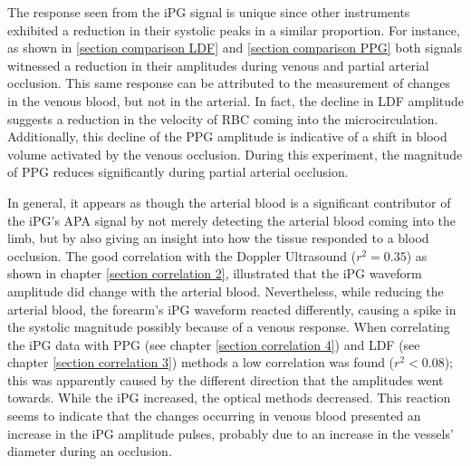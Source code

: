 The response seen from the iPG signal is unique since other instruments exhibited a reduction in their systolic peaks in a similar proportion. For instance, as shown in \ref{section comparison LDF} and \ref{section comparison PPG} both signals witnessed a reduction in their amplitudes during venous and partial arterial occlusion. This same response can be attributed to the measurement of changes in the venous blood, but not in the arterial. In fact, the decline in LDF amplitude suggests a reduction in the velocity of RBC coming into the microcirculation. Additionally, this decline of the PPG amplitude is indicative of a shift in blood volume activated by the venous occlusion. During this experiment, the magnitude of PPG reduces significantly during partial arterial occlusion.

In general, it appears as though the arterial blood is a significant contributor of the iPG's APA signal by not merely detecting the arterial blood coming into the limb, but by also giving an insight into how the tissue responded to a blood occlusion. The good correlation with the Doppler Ultrasound  ($r^2 = 0.35$) as shown in chapter \ref{section correlation 2}, illustrated that the iPG waveform amplitude did change with the arterial blood. Nevertheless, while reducing the arterial blood, the forearm's iPG waveform reacted differently, causing a spike in the systolic magnitude possibly because of a venous response.  When correlating the iPG data with PPG (see chapter \ref{section correlation 4}) and LDF (see chapter \ref{section correlation 3}) methods a low correlation was found ($r^2 < 0.08$); this was apparently caused by the different direction that the amplitudes went towards. While the iPG increased, the optical methods decreased. This reaction seems to indicate that the changes occurring in venous blood presented an increase in the iPG amplitude pulses, probably due to an increase in the vessels' diameter during an occlusion.


